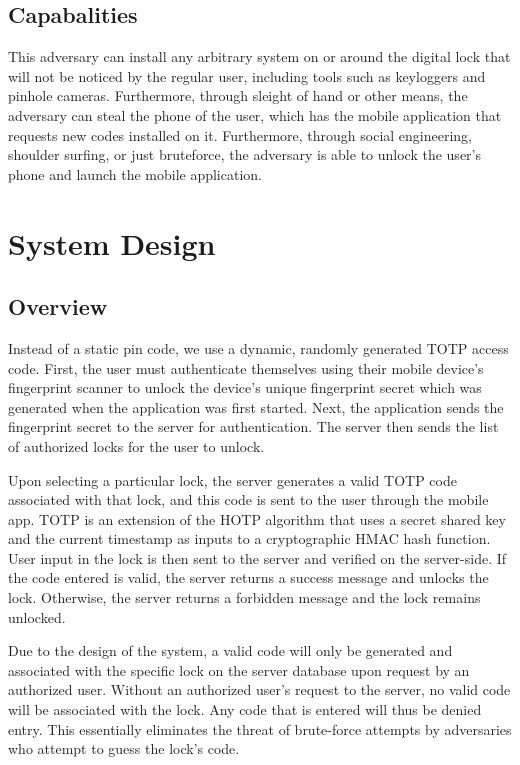\documentclass[conference]{IEEEtran}
\begin{document}
\subsection{Capabalities}
	This adversary can install any arbitrary system on or around the digital lock that will not be noticed by the regular user, including tools such as keyloggers and pinhole cameras. Furthermore, through sleight of hand or other means, the adversary can steal the phone of the user, which has the mobile application that requests new codes installed on it. Furthermore, through social engineering, shoulder surfing, or just bruteforce, the adversary is able to unlock the user’s phone and launch the mobile application.

\section{System Design}
\subsection{Overview}
	Instead of a static pin code, we use a dynamic, randomly generated TOTP access code. First, the user must authenticate themselves using their mobile device’s fingerprint scanner to unlock the device’s unique fingerprint secret which was generated when the application was first started. Next, the application sends the fingerprint secret to the server for authentication. The server then sends the list of authorized locks for the user to unlock. 
	
	Upon selecting a particular lock, the server generates a valid TOTP code associated with that lock, and this code is sent to the user through the mobile app. TOTP is an extension of the HOTP algorithm that uses a secret shared key and the current timestamp as inputs to a cryptographic HMAC hash function. User input in the lock is then sent to the server and verified on the server-side. If the code entered is valid, the server returns a success message and unlocks the lock. Otherwise, the server returns a forbidden message and the lock remains unlocked.
	
	Due to the design of the system, a valid code will only be generated and associated with the specific lock on the server database upon request by an authorized user. Without an authorized user’s request to the server, no valid code will be associated with the lock. Any code that is entered will thus be denied entry. This essentially eliminates the threat of brute-force attempts by adversaries who attempt to guess the lock’s code. 
\end{document}
